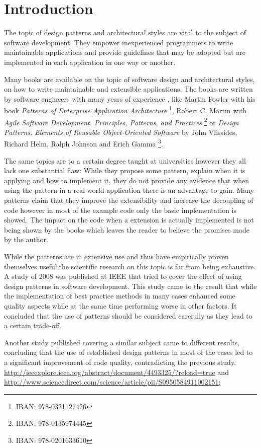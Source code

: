 \chapter{Introduction}

The topic of design patterns and architectural styles are vital to the subject of software development. They empower inexperienced programmers to write maintainable applications and provide guidelines that may be adopted but are implemented in each application in one way or another. 

Many books are available on the topic of software design and architectural styles, on how to write maintainable and extensible applications. The books are written by software engineers with many years of experience , like Martin Fowler with his book \emph{Patterns of Enterprise Application Architecture} \footnote{IBAN: 978-0321127426}, Robert C. Martin with \emph{Agile Software Development. Principles, Patterns, and Practices} \footnote{IBAN: 978-0135974445} or \emph{Design Patterns. Elements of Reusable Object-Oriented Software} by John Vlissides, Richard Helm, Ralph Johnson and Erich Gamma \footnote{IBAN: 978-0201633610}. 

The same topics are to a certain degree taught at universities however they all lack one substantial flaw: While they propose some pattern, explain when it is applying and how to implement it, they do not provide any evidence that when using the pattern in a real-world application there is an advantage to gain.  Many patterns claim that they improve the extensibility and increase the decoupling of code however in most of the example code only the basic implementation is showed. The impact on the code when a extension is actually implemented is not being shown by the books which leaves the reader to believe the promises made by the author. 


While the patterns are in extensive use and thus have empirically proven themselves useful,the scientific research on this topic is far from being exhaustive. A study of 2008 was published at IEEE that tried to cover the effect of using design patterns in software development. This study came to the result that while the implementation of best practice methods in many cases enhanced some quality aspects while at the same time performing worse in other factors. It concluded that the use of patterns should be considered carefully as they lead to a certain trade-off.

Another study published covering a similar subject came to different results, concluding that the use of established design patterns in most of the cases led to a significant improvement of code quality, contradicting the previous study. \href{http://ieeexplore.ieee.org/abstract/document/4493325/?reload=true}{http://ieeexplore.ieee.org/abstract/document/4493325/?reload=true} and \href{http://www.sciencedirect.com/science/article/pii/S0950584911002151;}{http://www.sciencedirect.com/science/article/pii/S0950584911002151;}

